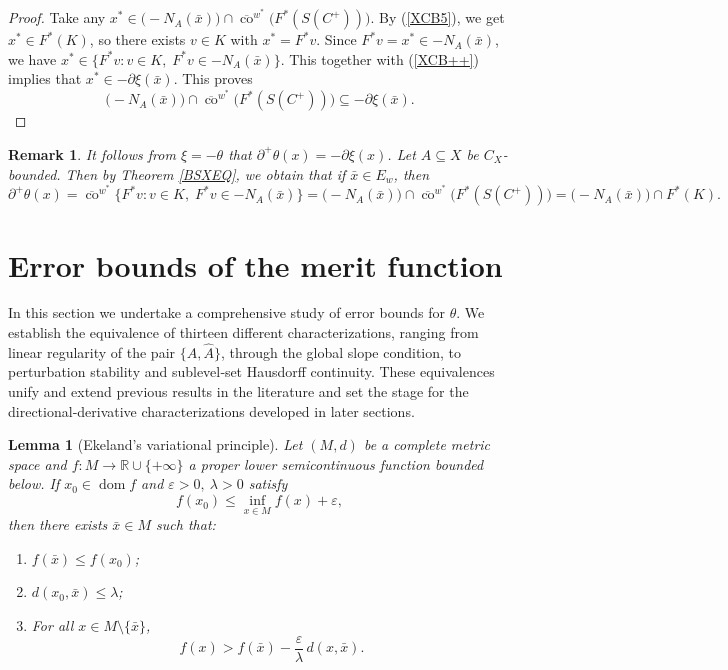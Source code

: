 \documentclass[10pt,a4paper]{amsart}
\newtheorem{lemma}{Lemma}[section]
\newtheorem{remark}{Remark}[section]
\begin{document}
\begin{proof}
 
	Take any $x^* \in \bigl( -N_A(\bar{x}) \bigr) \cap \overline{\operatorname{co}}^{w^*} \bigl( F^*(S(C^+)) \bigr)$.
	By (\ref{XCB5}), we get  $x^* \in F^*(K)$, so there exists $v \in K$ with $x^* = F^*v$.
	Since $F^*v  =    x^* \in -N_A(\bar{x})$,     we have $x^* \in \bigl\{ F^*v : v \in K,\; F^*v \in -N_A(\bar{x}) \bigr\}$.   This together with  (\ref{XCB++})  implies that  $x^* \in   -\partial \xi(\bar{x}).$
	 	This proves
	\[
	\bigl( -N_A(\bar{x}) \bigr) \cap \overline{\operatorname{co}}^{w^*} \bigl( F^*(S(C^+)) \bigr) \subseteq -\partial \xi(\bar{x}).
	\]
\end{proof}

\begin{remark}  \label{RXExcQ}  
	It follows from   $\xi = -\theta$  that  $	\partial^+ \theta(x) =  	- \partial \xi({x}) $.   Let $A  \subseteq X$ be $C_X$-bounded.    Then by Theorem \ref{BSXEQ}, we obtain that if $\bar{x} \in E_w$, then 
		\[
		\partial^+ \theta(x) = \overline{\operatorname{co}}^{w^*} \bigl\{ F^*v : v \in K,\; F^*v \in -N_A(\bar{x}) \bigr\} = \bigl( -N_A(\bar{x}) \bigr) \cap \overline{\operatorname{co}}^{w^*} \bigl( F^*(S(C^+)) \bigr) = \bigl( -N_A(\bar{x}) \bigr) \cap F^*(K).
	\]
	
	
	
  \end{remark}



\section{Error bounds   of the merit   function  }\label{sec:errorbounds}

 In this section we undertake a comprehensive study of error bounds for \(\theta\). We establish the equivalence of thirteen different characterizations, ranging from linear regularity of the pair \(\{A,\widehat A\}\), through  the  global slope condition, to perturbation stability and sublevel‐set Hausdorff continuity. These equivalences unify and extend previous results in the literature and set the stage for the directional‐derivative characterizations developed in later sections.  

\begin{lemma}[Ekeland's variational principle]\label{ELdaz}
	Let $(M, d)$ be a complete metric space and $f: M \to \mathbb{R} \cup \{+\infty\}$ a proper lower semicontinuous function bounded below. If $x_0 \in \operatorname{dom} f$ and $\varepsilon > 0,\ \lambda > 0$ satisfy
	\[
	f(x_0) \le \inf_{x \in M} f(x) + \varepsilon,
	\]
	then there exists $\bar{x} \in M$ such that:
	\begin{enumerate}
		\item $f(\bar{x}) \le f(x_0)$;
		\item $d(x_0, \bar{x}) \le \lambda$;
		\item For all $x \in M \setminus \{\bar{x}\}$,
		\[
		f(x) > f(\bar{x}) - \frac{\varepsilon}{\lambda} \, d(x, \bar{x}) .
		\]
	\end{enumerate}
\end{lemma}
\end{document}
